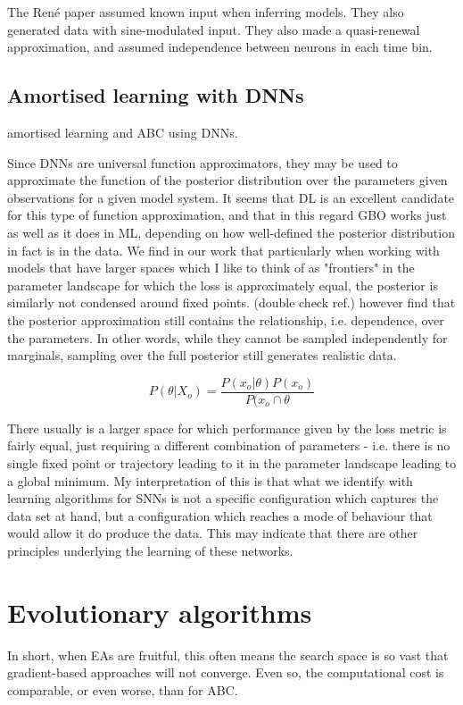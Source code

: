 \documentclass[mphil,deptreport,ai]{infthesis} %
\begin{document}
The René paper assumed known input when inferring models. They also generated data with sine-modulated input.
They also made a quasi-renewal approximation, and assumed independence between neurons in each time bin.


\subsection{Amortised learning with DNNs}

\cite{Lueckmann2018} amortised learning and ABC using DNNs.

Since DNNs are universal function approximators, they may be used to approximate the function of the posterior distribution over the parameters given observations for a given model system.
It seems that DL is an excellent candidate for this type of function approximation, and that in this regard GBO works just as well as it does in ML, depending on how well-defined the posterior distribution in fact is in the data.
We find in our work that particularly when working with models that have larger spaces which I like to think of as "frontiers" in the parameter landscape for which the loss is approximately equal, the posterior is similarly not condensed around fixed points.
\cite{Lueckmann2021} (double check ref.) however find that the posterior approximation still contains the relationship, i.e. dependence, over the parameters. 
In other words, while they cannot be sampled independently for marginals, sampling over the full posterior still generates realistic data.

\begin{equation}
    P(\theta|X_o) = \frac{P(x_o|\theta)P(x_o)}{P(x_o \cap \theta}
\end{equation}

There usually is a larger space for which performance given by the loss metric is fairly equal, just requiring a different combination of parameters - i.e. there is no single fixed point or trajectory leading to it in the parameter landscape leading to a global minimum.
My interpretation of this is that what we identify with learning algorithms for SNNs is not a specific configuration which captures the data set at hand, but a configuration which reaches a mode of behaviour that would allow it do produce the data.
This may indicate that there are other principles underlying the learning of these networks.

\section{Evolutionary algorithms}
In short, when EAs are fruitful, this often means the search space is so vast that gradient-based approaches will not converge.
Even so, the computational cost is comparable, or even worse, than for ABC.
\end{document}
